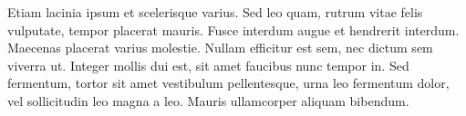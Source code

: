 Etiam lacinia ipsum et scelerisque varius. Sed leo quam, rutrum vitae felis vulputate, tempor placerat mauris. Fusce interdum augue et hendrerit interdum. Maecenas placerat varius molestie. Nullam efficitur est sem, nec dictum sem viverra ut. Integer mollis dui est, sit amet faucibus nunc tempor in. Sed fermentum, tortor sit amet vestibulum pellentesque, urna leo fermentum dolor, vel sollicitudin leo magna a leo. Mauris ullamcorper aliquam bibendum.